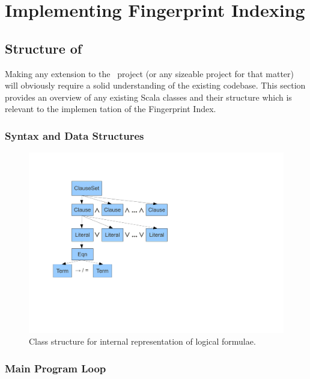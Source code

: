 
\chapter{Implementing Fingerprint Indexing}
\label{cha:method}

\section{Structure of \Beagle}
\label{sec:initial}

Making any extension to the \beagle\ project (or any sizeable project
for that matter) will obviously require a solid
understanding of the existing codebase. This section provides an overview
of any existing Scala classes and their structure which is relevant to the implemen
tation of the Fingerprint Index.

\subsection{Syntax and Data Structures}

\begin{figure}[h]
  \centering
  \includegraphics[clip,trim=2.5cm 5cm 10cm 2cm,width=\textwidth]{resources/logicstructure}
  \caption
   {Class structure for internal representation of logical formulae.}
   \label{fig:expressions}
\end{figure}

\subsection{Main Program Loop}


